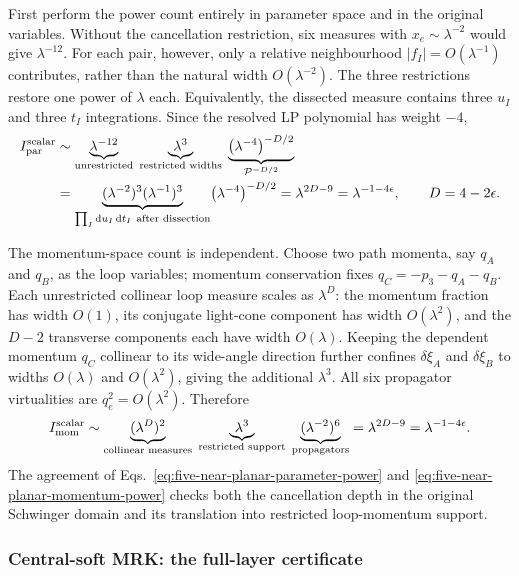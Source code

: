 \documentclass[a4paper,11pt]{article}
\newcommand{\dd}{\mathrm d}
\begin{document}
First perform the power count entirely in parameter space and in the
original variables.  Without the cancellation restriction, six measures
with \(x_e\sim\lambda^{-2}\) would give \(\lambda^{-12}\).  For each pair,
however, only a relative neighbourhood
\(|f_I|=O(\lambda^{-1})\) contributes, rather than the
natural width \(O(\lambda^{-2})\).  The three restrictions restore one power
of \(\lambda\) each.  Equivalently, the dissected measure contains three
\(u_I\) and three \(t_I\) integrations.  Since the resolved LP polynomial
has weight \(-4\),
\begin{align}
 I_{\rm par}^{\rm scalar}
 &\sim
 \underbrace{\lambda^{-12}}_{\text{unrestricted}}
 \;\underbrace{\lambda^{3}}_{\text{restricted widths}}
 \;\underbrace{\bigl(\lambda^{-4}\bigr)^{-D/2}}_{\mathcal P^{-D/2}}
 \nonumber\\
 &=
 \underbrace{(\lambda^{-2})^3(\lambda^{-1})^3}
             _{\prod_I\dd u_I\,\dd t_I\ \text{after dissection}}
 \bigl(\lambda^{-4}\bigr)^{-D/2}
 =\lambda^{2D-9}=\lambda^{-1-4\epsilon},
 \qquad D=4-2\epsilon.
 \label{eq:five-near-planar-parameter-power}
\end{align}

The momentum-space count is independent.  Choose two path momenta, say
\(q_A\) and \(q_B\), as the loop variables; momentum conservation fixes
\(q_C=-p_3-q_A-q_B\).  Each unrestricted collinear loop measure scales as
\(\lambda^D\): the momentum fraction has width \(O(1)\), its conjugate
light-cone component has width \(O(\lambda^2)\), and the \(D-2\) transverse
components each have width \(O(\lambda)\).  Keeping the dependent momentum
\(q_C\) collinear to its wide-angle direction further confines
\(\delta\xi_A\) and \(\delta\xi_B\) to widths \(O(\lambda)\) and
\(O(\lambda^2)\), giving the additional \(\lambda^3\).  All six propagator virtualities are
\(q_e^2=O(\lambda^2)\).  Therefore
\begin{equation}
 I_{\rm mom}^{\rm scalar}
 \sim
 \underbrace{(\lambda^D)^2}_{\text{collinear measures}}
 \;\underbrace{\lambda^3}_{\text{restricted support}}
 \;\underbrace{(\lambda^{-2})^6}_{\text{propagators}}
 =\lambda^{2D-9}=\lambda^{-1-4\epsilon}.
 \label{eq:five-near-planar-momentum-power}
\end{equation}
The agreement of Eqs.~\eqref{eq:five-near-planar-parameter-power} and
\eqref{eq:five-near-planar-momentum-power} checks both the cancellation
depth in the original Schwinger domain and its translation into restricted
loop-momentum support.

\subsubsection{Central-soft MRK: the full-layer certificate}
\label{sec:five-point-central-soft-status}
\end{document}
